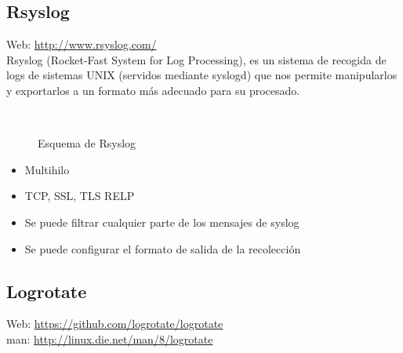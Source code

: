 \subsection{Rsyslog}

Web: \url{http://www.rsyslog.com/}\\

Rsyslog (Rocket-Fast System for Log Processing), es un sistema de recogida de logs de sistemas UNIX (servidos mediante syslogd) que nos permite manipularlos y exportarlos a un formato más adecuado para su procesado.\\
\begin{figure}[H]
  \\
  \caption{Esquema de Rsyslog}
\end{figure}

\begin{itemize}
\item Multihilo
\item TCP, SSL, TLS RELP
\item Se puede filtrar cualquier parte de los mensajes de syslog
\item Se puede configurar el formato de salida de la recolección
\end{itemize}

\subsection{Logrotate}

Web: \url{https://github.com/logrotate/logrotate}\\
man: \url{http://linux.die.net/man/8/logrotate}\\


